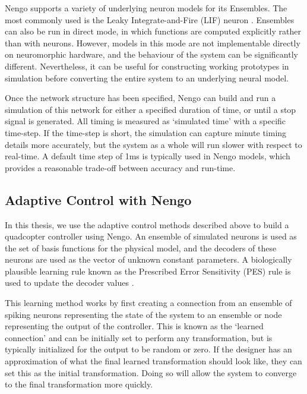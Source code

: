 \documentclass[letterpaper, 10 pt, conference]{ieeeconf}  %
\begin{document}
Nengo supports a variety of underlying neuron models for its Ensembles.
The most commonly used is the Leaky Integrate-and-Fire (LIF) neuron \cite{burkitt2006review}.
Ensembles can also be run in direct mode, in which functions are computed explicitly rather than with neurons.
However, models in this mode are not implementable directly on neuromorphic hardware, and the behaviour of the system can be significantly different.
Nevertheless, it can be useful for constructing working prototypes in simulation before converting the entire system to an underlying neural model. %

Once the network structure has been specified, Nengo can build and run a simulation of this network for either a specified duration of time, or until a stop signal is generated. 
All timing is measured as `simulated time' with a specific time-step. 
If the time-step is short, the simulation can capture minute timing details more accurately, but the system as a whole will run slower with respect to real-time. A default time step of 1ms is typically used in Nengo models, which provides a reasonable trade-off between accuracy and run-time.

\subsection{Adaptive Control with Nengo}

In this thesis, we use the adaptive control methods described above to build a quadcopter controller using Nengo. 
An ensemble of simulated neurons is used as the set of basis functions for the physical model, and the decoders of these neurons are used as the vector of unknown constant parameters. 
A biologically plausible learning rule known as the Prescribed Error Sensitivity (PES) rule is used to update the decoder values \cite{bekolay2013simultaneous}. 

This learning method works by first creating a connection from an ensemble of spiking neurons representing the state of the system to an ensemble or node representing the output of the controller. 
This is known as the `learned connection' and can be initially set to perform any transformation, but is typically initialized for the output to be random or zero. 
If the designer has an approximation of what the final learned transformation should look like, they can set this as the initial transformation. 
Doing so will allow the system to converge to the final transformation more quickly.
\end{document}
